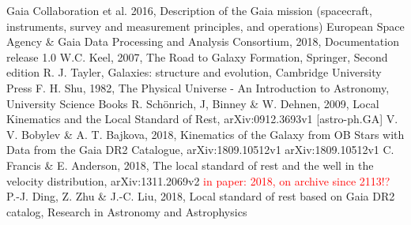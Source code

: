 \documentclass{aastex62}
\begin{document}
	\begin{thebibliography}{}
		
		 Gaia Collaboration et al. 2016, Description of the Gaia mission (spacecraft, instruments, survey and measurement principles, and operations)
		 European Space Agency \& Gaia Data Processing and Analysis Consortium, 2018, Documentation release 1.0
		W.C. Keel, 2007, The Road to Galaxy Formation, Springer, Second edition
		 R. J. Tayler, Galaxies: structure and evolution, Cambridge University Press
		 F. H. Shu, 1982, The Physical Universe - An Introduction to Astronomy, University Science Books
		 R. Sch\"{o}nrich, J, Binney \& W. Dehnen, 2009, Local Kinematics and the Local Standard of Rest, arXiv:0912.3693v1 [astro-ph.GA]
		 V. V. Bobylev \& A. T. Bajkova, 2018, Kinematics of the Galaxy from OB Stars with Data from the Gaia DR2 Catalogue, arXiv:1809.10512v1 arXiv:1809.10512v1
		 C. Francis \& E. Anderson, 2018, The local standard of rest and the well in the velocity distribution, arXiv:1311.2069v2 \textcolor{red}{in paper: 2018, on archive since 2113!?}
		 P.-J. Ding, Z. Zhu \& J.-C. Liu, 2018, Local standard of rest based on Gaia DR2 catalog, Research in Astronomy and Astrophysics
		
	\end{thebibliography}
	
\end{document}
